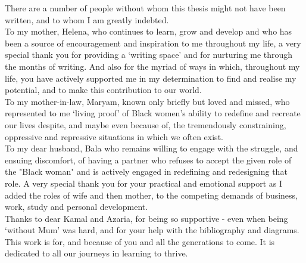 \documentclass[
11pt, 
english,
singlespacing,
headsepline,
]{MastersDoctoralThesis}
\begin{document}
\begin{acknowledgements}
\addchaptertocentry{\acknowledgementname} %
There are a number of people without whom this thesis might not have been written,
and to whom I am greatly indebted.\\

To my mother, Helena, who continues to learn, grow and develop and who has been a
source of encouragement and inspiration to me throughout my life, a very special
thank you for providing a ‘writing space’ and for nurturing me through the months of
writing. And also for the myriad of ways in which, throughout my life, you have
actively supported me in my determination to find and realise my potential, and to
make this contribution to our world.\\

To my mother-in-law, Maryam, known only briefly but loved and missed, who
represented to me ‘living proof’ of Black women’s ability to redefine and recreate our
lives despite, and maybe even because of, the tremendously constraining, oppressive
and repressive situations in which we often exist.\\

To my dear husband, Bala who remains willing to engage with the struggle, and
ensuing discomfort, of having a partner who refuses to accept the given role of the
"Black woman" and is actively engaged in redefining and redesigning that role. A
very special thank you for your practical and emotional support as I added the roles of
wife and then mother, to the competing demands of business, work, study and
personal development.\\

Thanks to dear Kamal and Azaria, for being so supportive - even when being ‘without
Mum’ was hard, and for your help with the bibliography and diagrams. This work is
for, and because of you and all the generations to come. It is dedicated to all our
journeys in learning to thrive.\\


\end{acknowledgements}
\end{document}
